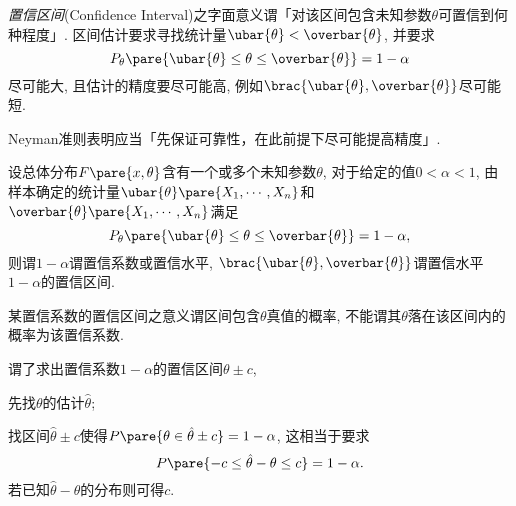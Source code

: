 \documentclass[../Statistics.tex]{subfiles}
\begin{document}
\emph{置信区间}(Confidence Interval)之字面意义谓「对该区间包含未知参数$\theta$可置信到何种程度」. 区间估计要求寻找统计量$\ubar{\theta}<\overbar{\theta}$, 并要求
\[ P_\theta\pare{\ubar{\theta} \le \theta \le \overbar{\theta}} = 1-\alpha \]
尽可能大, 且估计的精度要尽可能高, 例如$\brac{\ubar{\theta},\overbar{\theta}}$尽可能短.
\begin{remark}
    Neyman准则表明应当「先保证可靠性，在此前提下尽可能提高精度」.
\end{remark}
\begin{definition}
    设总体分布$F\pare{x,\theta}$含有一个或多个未知参数$\theta$, 对于给定的值$0<\alpha<1$, 由样本确定的统计量$\ubar{\theta}\pare{X_1,\cdots,X_n}$和$\overbar{\theta}\pare{X_1,\cdots,X_n}$满足
    \[ P_\theta\pare{\ubar{\theta} \le \theta \le \overbar{\theta}} = 1-\alpha, \]
    则谓$1-\alpha$谓置信系数或置信水平, $\brac{\ubar{\theta},\overbar{\theta}}$谓置信水平$1-\alpha$的置信区间.
\end{definition}
\begin{remark}
    某置信系数的置信区间之意义谓区间包含$\theta$真值的概率, 不能谓其$\theta$落在该区间内的概率为该置信系数.
\end{remark}
谓了求出置信系数$1-\alpha$的置信区间$\theta\pm c$,
\begin{cenum}
    \item 先找$\theta$的估计$\hat\theta$;
    \item 找区间$\hat\theta\pm c$使得$P\pare{\theta\in\hat\theta\pm c} = 1-\alpha$, 这相当于要求
    \[ P\pare{-c \le \hat\theta - \theta \le c} = 1-\alpha. \]
    若已知$\hat\theta - \theta$的分布则可得$c$.
\end{cenum}
\end{document}
